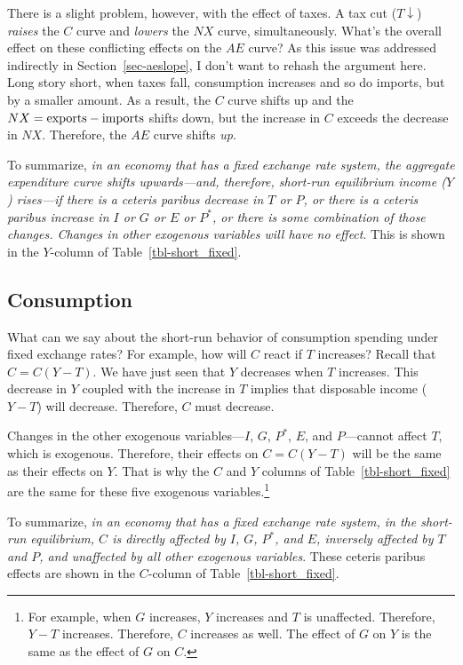 \documentclass[
  letterpaper,
]{book}
\theoremstyle{plain}
\theoremstyle{remark}
\begin{document}
There is a slight problem, however, with the effect of taxes. A tax cut
(\(T\downarrow\)) \emph{raises} the \(C\) curve and \emph{lowers} the
\(NX\) curve, simultaneously. What's the overall effect on these
conflicting effects on the \(AE\) curve? As this issue was addressed
indirectly in Section~\ref{sec-aeslope}, I don't want to rehash the
argument here. Long story short, when taxes fall, consumption increases
and so do imports, but by a smaller amount. As a result, the \(C\) curve
shifts up and the \(NX=\hbox{exports}-\hbox{imports}\) shifts down, but
the increase in \(C\) exceeds the decrease in \(NX\). Therefore, the
\(AE\) curve shifts \emph{up}.

To summarize, \emph{in an economy that has a fixed exchange rate system,
the aggregate expenditure curve shifts upwards---and, therefore,
short-run equilibrium income (\(Y\)) rises---if there is a ceteris
paribus decrease in \(T\) or \(P\), or there is a ceteris paribus
increase in \(I\) or \(G\) or \(E\) or \(P^*\), or there is some
combination of those changes. Changes in other exogenous variables will
have no effect}. This is shown in the \(Y\)-column of
Table~\ref{tbl-short_fixed}.

\subsection{Consumption}\label{sec-c-shortfix}

What can we say about the short-run behavior of consumption spending
under fixed exchange rates? For example, how will \(C\) react if \(T\)
increases? Recall that \(C=C(Y-T)\). We have just seen that \(Y\)
decreases when \(T\) increases. This decrease in \(Y\) coupled with the
increase in \(T\) implies that disposable income (\(Y-T\)) will
decrease. Therefore, \(C\) must decrease.

Changes in the other exogenous variables---\(I\), \(G\), \(P^*\), \(E\),
and \(P\)---cannot affect \(T\), which is exogenous. Therefore, their
effects on \(C=C(Y-T)\) will be the same as their effects on \(Y\). That
is why the \(C\) and \(Y\) columns of Table~\ref{tbl-short_fixed} are
the same for these five exogenous variables.\footnote{For example, when
  \(G\) increases, \(Y\) increases and \(T\) is unaffected. Therefore,
  \(Y-T\) increases. Therefore, \(C\) increases as well. The effect of
  \(G\) on \(Y\) is the same as the effect of \(G\) on \(C\).}

To summarize, \emph{in an economy that has a fixed exchange rate system,
in the short-run equilibrium, \(C\) is directly affected by \(I\),
\(G\), \(P^*\), and \(E\), inversely affected by \(T\) and \(P\), and
unaffected by all other exogenous variables}. These ceteris paribus
effects are shown in the \(C\)-column of Table~\ref{tbl-short_fixed}.
\end{document}
